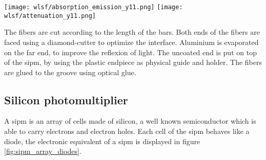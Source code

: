 \begin{figure*}
  \centering
  \texttt{[image: wlsf/absorption\_emission\_y11.png]}
  \hspace*{1em}
  \texttt{[image: wlsf/attenuation\_y11.png]}
  \caption{%
    Absorption and emission spectrum of the \glspl{wlsf} displayed on the left shows peaking fluorescence emission at 476 nm and a maximal absorption at 430 nm.
    Attenuation of the spectrum of the \glspl{wlsf} on the right displays the spectrum at different distances (fttb 10, 30, 100, 300cm) from the source's incident point.
    The used light source to excite the fibers had a wave length of 430nm.
    Source: \href{http://kuraraysf.jp/pdf/all.pdf}{kuraray's product catalogue}
  }
  \label{fig:wlsf_observations}
\end{figure*}

The fibers are cut according to the length of the bars.
Both ends of the fibers are faced using a diamond-cutter to optimize the interface.
Aluminium is evaporated on the far end, to improve the reflexion of light.
The uncoated end is put on top of the \gls{sipm}, by using the plastic endpiece as physical guide and holder.
The fibers are glued to the groove using optical glue.

\clearpage
\subsection{Silicon photomultiplier}

A \gls{sipm} is an array of cells made of silicon, a well known semiconductor which is able to carry electrons and electron holes.
Each cell of the \gls{sipm} behaves like a diode, the electronic equivalent of a \gls{sipm} is displayed in figure \ref{fig:sipm_array_diodes}.

